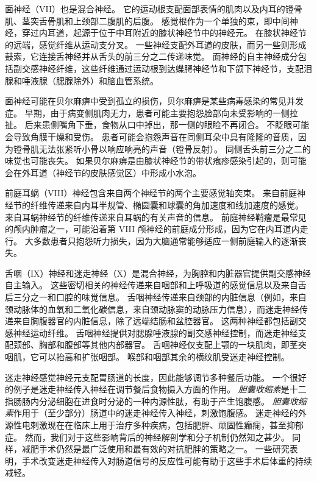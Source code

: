 面神经（VII）也是混合神经。
它的运动根支配面部表情的肌肉以及内耳的镫骨肌、茎突舌骨肌和上颈部二腹肌的后腹。
感觉根作为一个单独的束，即中间神经，穿过内耳道，起源于位于中耳附近的膝状神经节中的神经元。
在膝状神经节的远端，感觉纤维从运动支分叉。
一些神经支配外耳道的皮肤，而另一些则形成鼓索，它连接舌神经并从舌头的前三分之二传递味觉。
面神经的自主神经成分包括副交感神经纤维，这些纤维通过运动根到达蝶腭神经节和下颌下神经节，支配泪腺和唾液腺（腮腺除外）和脑血管系统。


面神经可能在贝尔麻痹中受到孤立的损伤，贝尔麻痹是某些病毒感染的常见并发症。
早期，由于病变侧肌肉无力，患者可能主要抱怨脸部向未受影响的一侧拉扯。
后来患侧嘴角下垂，食物从口中掉出，那一侧的眼睑不再闭合。
不眨眼可能会导致角膜干燥和受伤。
患者可能会抱怨声音在同侧耳朵中具有隆隆的音质，因为镫骨肌无法张紧听小骨以响应响亮的声音（镫骨反射）。
同侧舌头前三分之二的味觉也可能丧失。
如果贝尔麻痹是由膝状神经节的带状疱疹感染引起的，则可能会在外耳道（神经节的皮肤感觉区）中形成小水泡。


前庭耳蜗（VIII）神经包含来自两个神经节的两个主要感觉轴突束。
来自前庭神经节的纤维传递来自内耳半规管、椭圆囊和球囊的角加速度和线加速度的感觉。
来自耳蜗神经节的纤维传递来自耳蜗的有关声音的信息。
前庭神经鞘瘤是最常见的颅内肿瘤之一，可能沿着第 VIII 颅神经的前庭成分形成，因为它在内耳道内走行。
大多数患者只抱怨听力损失，因为大脑通常能够适应一侧前庭输入的逐渐丧失。


舌咽（IX）神经和迷走神经（X）是混合神经，为胸腔和内脏器官提供副交感神经自主输入。
这些密切相关的神经传递来自咽部和上呼吸道的感觉信息以及来自舌后三分之一和口腔的味觉信息。
舌咽神经传递来自颈部的内脏信息（例如，来自颈动脉体的血氧和二氧化碳信息，来自颈动脉窦的动脉压力信息），而迷走神经传递来自胸腹器官的内脏信息，除了远端结肠和盆腔器官。
这两种神经都包括副交感神经运动纤维。
舌咽神经提供对腮腺唾液腺的副交感神经控制，而迷走神经支配颈部、胸部和腹部等其他内部器官。
舌咽神经仅支配上颚的一块肌肉，即茎突咽肌，它可以抬高和扩张咽部。
喉部和咽部其余的横纹肌受迷走神经控制。


迷走神经感觉神经元支配胃肠道的长度，因此能够调节多种餐后功能。
一个很好的例子是迷走神经传入神经在调节餐后食物摄入方面的作用。
\textit{胆囊收缩素}是十二指肠肠内分泌细胞在进食时分泌的一种内源性肽，有助于产生饱腹感。
\textit{胆囊收缩素}作用于（至少部分）肠道中的迷走神经传入神经，刺激饱腹感。
迷走神经的外源性电刺激现在在临床上用于治疗多种疾病，包括肥胖、顽固性癫痫，甚至抑郁症。
然而，我们对于这些影响背后的神经解剖学和分子机制仍然知之甚少。
同样，减肥手术仍然是最广泛使用和最有效的对抗肥胖的策略之一。
一些研究表明，手术改变迷走神经传入对肠道信号的反应性可能有助于这些手术后体重的持续减轻。


